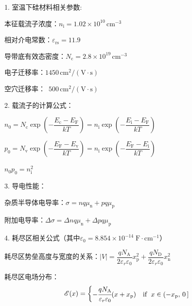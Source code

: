 \documentclass{ctexart}
\begin{document}
{
    
    1. 室温下硅材料相关参数:\par
    \qquad 本征载流子浓度：$n_\text{i} = 1.02 \times 10^{10} \, \text{cm}^{-3}$ \par
    \qquad 相对介电常数：$\varepsilon_\text{rs} = 11.9$ \par
    \qquad 导带底有效态密度：$N_\text{c} = 2.8\times 10^{19} \, \text{cm}^{-3}$ \par
    \qquad 电子迁移率：$1450\, \text{cm}^2 / (\text{V}\cdot \text{s})$ \par
    \qquad 空穴迁移率：$\, \, \, 500\, \text{cm}^2 / (\text{V}\cdot \text{s})$ \par

    \vspace{0.5cm}
    
    2. 载流子的计算公式：\par
    
    \vspace{0.1cm}
    
    \qquad \qquad $n_0 = N_\text{c} \exp \left( -\dfrac{E_\text{c} - E_\text{F}}{kT}\right) = n_\text{i} \exp \left( -\dfrac{E_\text{i} - E_\text{F}}{kT}\right)$ \par
    
    \vspace{0.1cm}
    
    \qquad \qquad $p_0 = N_\text{v} \exp \left( -\dfrac{E_\text{F} - E_\text{v}}{kT}\right) = n_\text{i} \exp \left( -\dfrac{E_\text{F} - E_\text{i}}{kT}\right)$ \par 
    
    \vspace{0.1cm}
    
    \qquad \qquad $n_0 p_0 = n_\text{i}^2$ \par
    
    \vspace{0.5cm}
    
    3. 导电性能：\par
    \qquad 杂质半导体电导率：$ \sigma = n q \mu_\text{n} + p q \mu_\text{p}$ \par
    \qquad 附加电导率：$ \Delta \sigma =\Delta  n q \mu_\text{n} + \Delta  p q \mu_\text{p}$ \par

    \vspace{0.5cm}
    
    4. 耗尽区相关公式（其中$\varepsilon_0 = 8.854 \times 10^{-14} \; \text{F} \cdot \text{cm}^{-1} $）\par
    \vspace{0.1cm}
    \qquad 耗尽区势垒高度与宽度的关系：$|V| = \dfrac{q N_\text{A}}{2\varepsilon_r \varepsilon_0} x_\text{p}^2 + \dfrac{q N_\text{D}}{2\varepsilon_r \varepsilon_0} x_\text{n}^2$ \par
    \qquad 耗尽区电场分布：
    \vspace{-0.3cm}
    \[
        \mathscr{E} (x) = 
        \begin{cases}
            -\cfrac{q N_\text{A}}{\varepsilon_r \varepsilon_0} (x + x_\text{p}) & \text{if }\; x \in (-x_\text{p},\, 0\, ] \\
            

\end{cases}\]}
\end{document}

